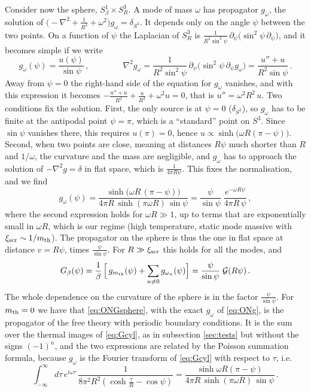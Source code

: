 \documentclass[a4paper,11pt]{article}
\newcommand{\xiscr}{\xi_{\rm scr}}
\begin{document}
Consider now the sphere, $S^1_\beta\times S^3_R$. A mode of mass $\omega$ has propagator $g_\omega$, the solution of $\bigl(-\nabla^2+\tfrac{1}{R^2}+\omega^2\bigr)g_\omega=\delta_{S^3}$. It depends only on the angle $\psi$ between the two points. On a function of $\psi$ the Laplacian of $S^3_R$ is $\tfrac{1}{R^2\sin^2\psi}\,\partial_\psi\bigl(\sin^2\psi\,\partial_\psi\bigr)$, and it becomes simple if we write
\begin{equation}
	g_\omega(\psi)=\frac{u(\psi)}{\sin\psi}\, ,\qquad\qquad
	\nabla^2g_\omega=\frac{1}{R^2\sin^2\psi}\,\partial_\psi\bigl(\sin^2\psi\,\partial_\psi g_\omega\bigr)=\frac{u''+u}{R^2\sin\psi}\, .
\end{equation}
Away from $\psi=0$ the right-hand side of the equation for $g_\omega$ vanishes, and with this expression it becomes $-\tfrac{u''+u}{R^2}+\tfrac{u}{R^2}+\omega^2u=0$, that is $u''=\omega^2R^2\,u$. Two conditions fix the solution. First, the only source is at $\psi=0$ ($\delta_{S^3}$), so $g_\omega$ has to be finite at the antipodal point $\psi=\pi$, which is a ``standard'' point on $S^3$. Since $\sin\psi$ vanishes there, this requires $u(\pi)=0$, hence $u\propto\sinh\bigl(\omega R(\pi-\psi)\bigr)$. Second, when two points are close, meaning at distances $R\psi$ much shorter than $R$ and $1/\omega$, the curvature and the mass are negligible, and $g_\omega$ has to approach the solution of $-\nabla^2g=\delta$ in flat space, which is $\tfrac{1}{4\pi R\psi}$. This fixes the normalisation, and we find
\begin{equation}\label{eq:ONg}
	g_\omega(\psi)=\frac{\sinh\bigl(\omega R\,(\pi-\psi)\bigr)}{4\pi R\,\sinh(\pi\omega R)\,\sin\psi}=\frac{\psi}{\sin\psi}\;\frac{e^{-\omega R\psi}}{4\pi R\,\psi}\, ,
\end{equation}
where the second expression holds for $\omega R\gg1$, up to terms that are exponentially small in $\omega R$, which is our regime (high temperature, static mode massive with $\xi_{\rm scr} \sim 1/m_{\rm th}$). The propagator on the sphere is thus the one in flat space at distance $v=R\psi$, times $\tfrac{\psi}{\sin\psi}$. For $R\gg\xiscr$ this holds for all the modes, and
\begin{equation}\label{eq:ONGsphere}
	G_\beta(\psi)=\frac1\beta\,\Bigl[\,g_{m_{\rm th}}(\psi)+\sum_{n\neq0}g_{\omega_n}(\psi)\Bigr]=\frac{\psi}{\sin\psi}\;\mathcal{G}(R\psi)\, .
\end{equation}
The whole dependence on the curvature of the sphere is in the factor $\tfrac{\psi}{\sin\psi}$. For $m_{\rm th}=0$ we have that  \eqref{eq:ONGsphere}, with the exact
$g_\omega$ of \eqref{eq:ONg}, is the propagator of the free theory with
periodic boundary conditions. It is the sum over the thermal images of
\eqref{eq:Gcyl}, as in subsection \ref{sec:tests} but without the signs
$(-1)^n$, and the two expressions are related by the Poisson summation formula,
because $g_\omega$ is the Fourier transform of \eqref{eq:Gcyl} with respect to $\tau$, i.e. 
\begin{equation}
	\int_{-\infty}^{\infty} d\tau\, e^{i\omega\tau}\,
	\frac{1}{8\pi^2R^2\left(\cosh\frac{\tau}{R}-\cos\psi\right)}
	= \frac{\sinh\omega R(\pi-\psi)}{4\pi R\,\sinh(\pi\omega R)\,\sin\psi}\,.
\end{equation}
\end{document}
